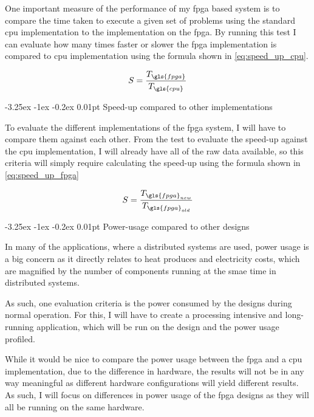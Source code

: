 \documentclass[paper=a4, fontsize=11pt, bibliography=totocnumbered]{scrartcl}
\makeatletter
\renewcommand\paragraph{\@startsection{paragraph}{4}{\z@}%
  {-3.25ex \@plus -1ex \@minus -0.2ex}%
  {0.01pt}%
  {\raggedsection\normalfont\sectfont\nobreak\size@paragraph}%
}
\numberwithin{equation}{section}		%
\numberwithin{figure}{section}			%
\numberwithin{table}{section}				%
\makeatother
\begin{document}
One important measure of the performance of my \gls{fpga} based system is to compare the time taken to execute a given set of problems using the standard \gls{cpu} implementation to the implementation on the \gls{fpga}. By running this test I can evaluate how many times faster or slower the \gls{fpga} implementation is compared to \gls{cpu} implementation using the formula shown in \cref{eq:speed_up_cpu}.

\begin{equation}
\label{eq:speed_up_cpu}
S = \frac{T_{\gls{fpga}}}{T_{\gls{cpu}}}
\end{equation}

\paragraph{Speed-up compared to other  implementations}

To evaluate the different implementations of the \gls{fpga} system, I will have to compare them against each other. From the test to evaluate the speed-up against the \gls{cpu} implementation, I will already have all of the raw data available, so this criteria will simply require calculating the speed-up using the formula shown in \cref{eq:speed_up_fpga}

\begin{equation}
\label{eq:speed_up_fpga}
S = \frac{T_{\gls{fpga}_{new}}}{T_{\gls{fpga}_{old}}}
\end{equation}

\paragraph{Power-usage compared to other  designs}

In many of the applications, where a distributed systems are used, power usage is a big concern\cite{pub:4_xizhou_feng_rong_ge_cameron} as it directly relates to heat produces and electricity costs, which are magnified by the number of components running at the smae time in distributed systems.

As such, one evaluation criteria is the power consumed by the designs during normal operation. For this, I will have to create a processing intensive and long-running application, which will be run on the design and the power usage profiled.

While it would be nice to compare the power usage between the \gls{fpga} and a \gls{cpu} implementation, due to the difference in hardware, the results will not be in any way meaningful as different hardware configurations will yield different results. As such, I will focus on differences in power usage of the \gls{fpga} designs as they will all be running on the same hardware.
\end{document}
